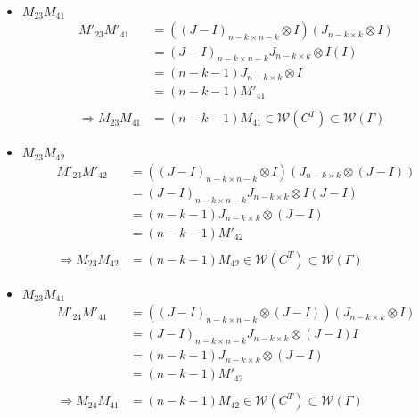 \documentclass{article}
\begin{document}
\begin{itemize}
\begin{itemize}
\begin{itemize}
            \item $M_{23}M_{41}$
            \begin{align*}
                M'_{23}M'_{41}
                &= ((J-I)_{n-k\times n-k} \otimes I)(J_{n-k\times k}\otimes I) \\
                &= (J-I)_{n-k\times n-k}J_{n-k\times k}\otimes I(I) \\
                &= (n-k-1)J_{n-k\times k}\otimes I\\
                &= (n-k-1)M'_{41} \\\\
                \Rightarrow M_{23}M_{41} &= (n-k-1)M_{41}\in\mathcal{W}(C^T)\subset\mathcal{W}(\Gamma)
            \end{align*}
            
            \item $M_{23}M_{42}$
            \begin{align*}
                M'_{23}M'_{42}
                &= ((J-I)_{n-k\times n-k} \otimes I)(J_{n-k\times k}\otimes (J-I)) \\
                &= (J-I)_{n-k\times n-k}J_{n-k\times k}\otimes I(J-I) \\
                &= (n-k-1)J_{n-k\times k}\otimes (J-I)\\
                &= (n-k-1)M'_{42} \\\\
                \Rightarrow M_{23}M_{42} &= (n-k-1)M_{42}\in\mathcal{W}(C^T)\subset\mathcal{W}(\Gamma)
            \end{align*}
            
            \item $M_{23}M_{41}$
            \begin{align*}
                M'_{24}M'_{41}
                &= ((J-I)_{n-k\times n-k} \otimes (J-I))(J_{n-k\times k}\otimes I) \\
                &= (J-I)_{n-k\times n-k}J_{n-k\times k}\otimes (J-I)I \\
                &= (n-k-1)J_{n-k\times k}\otimes (J-I)\\
                &= (n-k-1)M'_{42} \\\\
                \Rightarrow M_{24}M_{41} &= (n-k-1)M_{42}\in\mathcal{W}(C^T)\subset\mathcal{W}(\Gamma)
            \end{align*}
            

\end{itemize}
\end{itemize}
\end{itemize}
\end{document}

